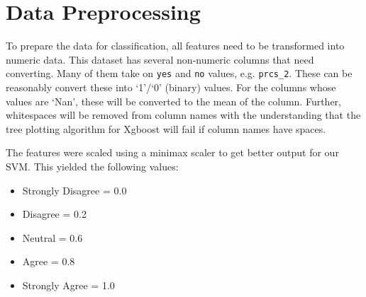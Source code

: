 \section*{Data Preprocessing}

To prepare the data for classification, all features need to be transformed into numeric data. This dataset has several non-numeric columns that need converting. Many of them take on \texttt{yes} and \texttt{no} values, e.g. \texttt{prcs\_2}. These can be reasonably convert these into `1'/`0' (binary) values. For the columns whose values are `Nan', these will be converted to the mean of the column. Further, whitespaces will be removed from column names with the understanding that the tree plotting algorithm for Xgboost will fail if column names have spaces. 

The features were scaled using a minimax scaler to get better output for our SVM. This yielded the following values:
\begin {itemize}    
\item Strongly Disagree = 0.0
\item Disagree = 0.2
\item Neutral = 0.6
\item Agree = 0.8
\item Strongly Agree = 1.0
\end{itemize} 


